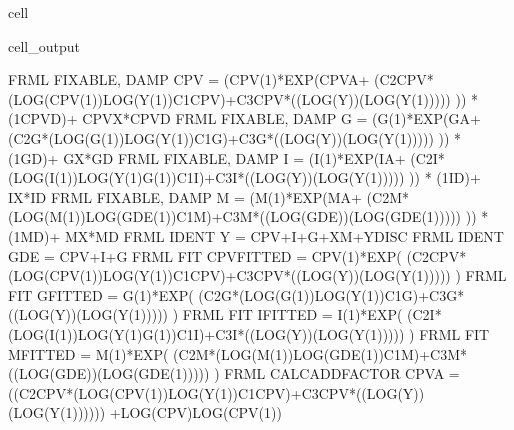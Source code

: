 \documentclass[letterpaper,10pt,english]{jupyterBook}
\begin{document}
\begin{sphinxuseclass}{cell}
\begin{sphinxVerbatimOutput}
\begin{sphinxuseclass}{cell_output}
\begin{sphinxVerbatim}[commandchars=\\\{\}]
FRML \PYGZlt{}FIXABLE, DAMP\PYGZgt{} CPV = (CPV(\PYGZhy{}1)*EXP(CPV\PYGZus{}A+ (\PYGZhy{}C2\PYGZus{}CPV*(LOG(CPV(\PYGZhy{}1))\PYGZhy{}LOG(Y(\PYGZhy{}1))\PYGZhy{}C1\PYGZus{}CPV)+C3\PYGZus{}CPV*((LOG(Y))\PYGZhy{}(LOG(Y(\PYGZhy{}1))))) )) * (1\PYGZhy{}CPV\PYGZus{}D)+ CPV\PYGZus{}X*CPV\PYGZus{}D \PYGZdl{}
FRML \PYGZlt{}FIXABLE, DAMP\PYGZgt{} G = (G(\PYGZhy{}1)*EXP(G\PYGZus{}A+ (\PYGZhy{}C2\PYGZus{}G*(LOG(G(\PYGZhy{}1))\PYGZhy{}LOG(Y(\PYGZhy{}1))\PYGZhy{}C1\PYGZus{}G)+C3\PYGZus{}G*((LOG(Y))\PYGZhy{}(LOG(Y(\PYGZhy{}1))))) )) * (1\PYGZhy{}G\PYGZus{}D)+ G\PYGZus{}X*G\PYGZus{}D \PYGZdl{}
FRML \PYGZlt{}FIXABLE, DAMP\PYGZgt{} I = (I(\PYGZhy{}1)*EXP(I\PYGZus{}A+ (\PYGZhy{}C2\PYGZus{}I*(LOG(I(\PYGZhy{}1))\PYGZhy{}LOG(Y(\PYGZhy{}1)\PYGZhy{}G(\PYGZhy{}1))\PYGZhy{}C1\PYGZus{}I)+C3\PYGZus{}I*((LOG(Y))\PYGZhy{}(LOG(Y(\PYGZhy{}1))))) )) * (1\PYGZhy{}I\PYGZus{}D)+ I\PYGZus{}X*I\PYGZus{}D \PYGZdl{}
FRML \PYGZlt{}FIXABLE, DAMP\PYGZgt{} M = (M(\PYGZhy{}1)*EXP(M\PYGZus{}A+ (\PYGZhy{}C2\PYGZus{}M*(LOG(M(\PYGZhy{}1))\PYGZhy{}LOG(GDE(\PYGZhy{}1))\PYGZhy{}C1\PYGZus{}M)+C3\PYGZus{}M*((LOG(GDE))\PYGZhy{}(LOG(GDE(\PYGZhy{}1))))) )) * (1\PYGZhy{}M\PYGZus{}D)+ M\PYGZus{}X*M\PYGZus{}D \PYGZdl{}
FRML \PYGZlt{}IDENT\PYGZgt{} Y = CPV+I+G+X\PYGZhy{}M+YDISC\PYGZdl{}
FRML \PYGZlt{}IDENT\PYGZgt{} GDE = CPV+I+G\PYGZdl{}
FRML \PYGZlt{}FIT\PYGZgt{} CPV\PYGZus{}FITTED = CPV(\PYGZhy{}1)*EXP( (\PYGZhy{}C2\PYGZus{}CPV*(LOG(CPV(\PYGZhy{}1))\PYGZhy{}LOG(Y(\PYGZhy{}1))\PYGZhy{}C1\PYGZus{}CPV)+C3\PYGZus{}CPV*((LOG(Y))\PYGZhy{}(LOG(Y(\PYGZhy{}1))))) )\PYGZdl{}
FRML \PYGZlt{}FIT\PYGZgt{} G\PYGZus{}FITTED = G(\PYGZhy{}1)*EXP( (\PYGZhy{}C2\PYGZus{}G*(LOG(G(\PYGZhy{}1))\PYGZhy{}LOG(Y(\PYGZhy{}1))\PYGZhy{}C1\PYGZus{}G)+C3\PYGZus{}G*((LOG(Y))\PYGZhy{}(LOG(Y(\PYGZhy{}1))))) )\PYGZdl{}
FRML \PYGZlt{}FIT\PYGZgt{} I\PYGZus{}FITTED = I(\PYGZhy{}1)*EXP( (\PYGZhy{}C2\PYGZus{}I*(LOG(I(\PYGZhy{}1))\PYGZhy{}LOG(Y(\PYGZhy{}1)\PYGZhy{}G(\PYGZhy{}1))\PYGZhy{}C1\PYGZus{}I)+C3\PYGZus{}I*((LOG(Y))\PYGZhy{}(LOG(Y(\PYGZhy{}1))))) )\PYGZdl{}
FRML \PYGZlt{}FIT\PYGZgt{} M\PYGZus{}FITTED = M(\PYGZhy{}1)*EXP( (\PYGZhy{}C2\PYGZus{}M*(LOG(M(\PYGZhy{}1))\PYGZhy{}LOG(GDE(\PYGZhy{}1))\PYGZhy{}C1\PYGZus{}M)+C3\PYGZus{}M*((LOG(GDE))\PYGZhy{}(LOG(GDE(\PYGZhy{}1))))) )\PYGZdl{}
FRML \PYGZlt{}CALC\PYGZus{}ADD\PYGZus{}FACTOR\PYGZgt{} CPV\PYGZus{}A = \PYGZhy{} ((\PYGZhy{}C2\PYGZus{}CPV*(LOG(CPV(\PYGZhy{}1))\PYGZhy{}LOG(Y(\PYGZhy{}1))\PYGZhy{}C1\PYGZus{}CPV)+C3\PYGZus{}CPV*((LOG(Y))\PYGZhy{}(LOG(Y(\PYGZhy{}1)))))) +LOG(CPV)\PYGZhy{}LOG(CPV(\PYGZhy{}1))\PYGZdl{}

\end{sphinxVerbatim}
\end{sphinxuseclass}
\end{sphinxVerbatimOutput}
\end{sphinxuseclass}
\end{document}
